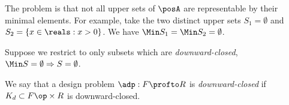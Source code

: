 The problem is that not all upper sets of $\posA$ are representable by their minimal elements.
For example, take the two distinct upper sets $S_1 = \emptyset$ and $S_2 = \{x \in \reals : x > 0\}$.
We have $\Min S_1 = \Min S_2 = \emptyset$.

Suppose we restrict to only subsets which are \emph{downward-closed}, \ie  $\Min S = \emptyset \Rightarrow S = \emptyset$.





We say that a design problem $\adp : F \profto R$ is \emph{downward-closed} if $K_d \subset F\op \times R$ is downward-closed.



